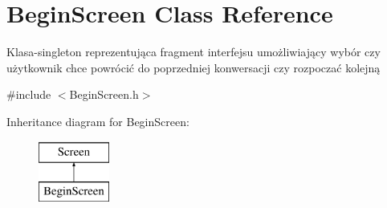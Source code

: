 \hypertarget{class_begin_screen}{}\section{Begin\+Screen Class Reference}
\label{class_begin_screen}


Klasa-\/singleton reprezentująca fragment interfejsu umożliwiający wybór czy użytkownik chce powrócić do poprzedniej konwersacji czy rozpoczać kolejną  




{\ttfamily \#include $<$Begin\+Screen.\+h$>$}

Inheritance diagram for Begin\+Screen\+:\begin{figure}[H]
\begin{center}
\leavevmode
\includegraphics[height=2.000000cm]{class_begin_screen}
\end{center}
\end{figure}
